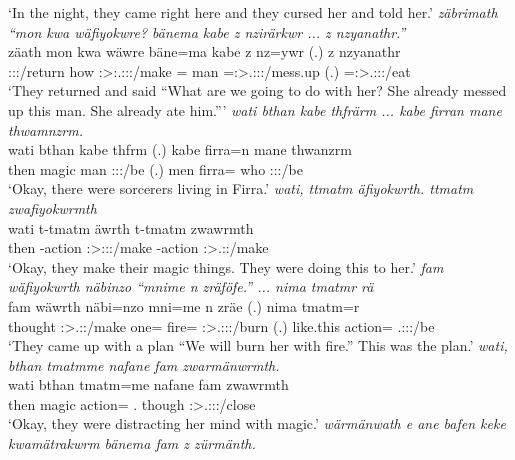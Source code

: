 \begin{exe}
	\trans `In the night, they came right here and they cursed her and told her.'
	\emph{zäbrimath ``mon kwa wäfiyokwre? bänema kabe z nzirärkwr ... z nzyanathr.''}\\
	\gll zäath mon kwa wäwre bäne=ma kabe z nz=ywr (.) z nzyanathr\\
	\Stpl:\Sbj:\Pst:\Pfv/return how {\Fut} \Fpl:\Sbj>:\Tsg.\F:\Obj:\Nonpast:\Ipfv/make \Recog={\Char} man {\Iam} \Immpst=\Stsg:\Sbj>\Tsg.\Masc:\Obj:\Nonpast:\Ipfv/mess.up (.) {\Iam} \Immpst=\Stsg:\Sbj>\Tsg.\Masc:\Obj:\Nonpast:\Ipfv/eat\\
	\trans `They returned and said ``What are we going to do with her? She already messed up this man. She already ate him.'''
	\emph{wati bthan kabe thfrärm ... kabe firran mane thwamnzrm.}\\
	\gll wati bthan kabe thfrm (.) kabe firra=n mane thwanzrm\\
	then magic man \Stpl:\Sbj:\Pst:\Dur/be (.) men firra={\Loc} who \Stpl:\Sbj:\Pst:\Dur/be\\
	\trans `Okay, there were sorcerers living in Firra.'
	\emph{wati, ttmatm äfiyokwrth. ttmatm zwafiyokwrmth}\\
	\gll wati t-tmatm äwrth t-tmatm zwawrmth\\
	then \Redup-action \Stpl:\Sbj>\Stpl:\Obj:\Nonpast:\Ipfv/make \Redup-action \Stpl:\Sbj>\Tsg.\F:\Pst:\Dur/make\\
	\trans `Okay, they make their magic things. They were doing this to her.'
	\emph{fam wäfiyokwrth näbinzo ``mnime n zräföfe.'' ... nima tmatmr rä}\\
	\gll fam wäwrth näbi=nzo mni=me n zräe (.) nima tmatm=r \\
	thought \Stpl:\Sbj>\Tsg.\F:\Nonpast:\Ipfv/make one={\Only} fire={\Ins} {\Imn} \Fpl:\Sbj>\Tsg.\F:\Obj:\Irr:\Pfv/burn (.) {like.this} action={\Purp} \Tsg.\F:\Sbj:\Nonpast:\Ipfv/be\\
	\trans `They came up with a plan ``We will burn her with fire.'' This was the plan.'
\newpage 	
{}
	\emph{wati, bthan tmatmme nafane fam zwarmänwrmth.}\\
	\gll wati bthan tmatm=me nafane fam zwawrmth\\
	then magic action={\Ins} \Tsg.{\Poss} though \Stpl:\Sbj>\Tsg.\F:\Io:\Pst:\Dur/close\\
	\trans `Okay, they were distracting her mind with magic.'
	\emph{wärmänwath e ane bafen keke kwamätrakwrm bänema fam z zürmänth.}\\

\end{exe}
